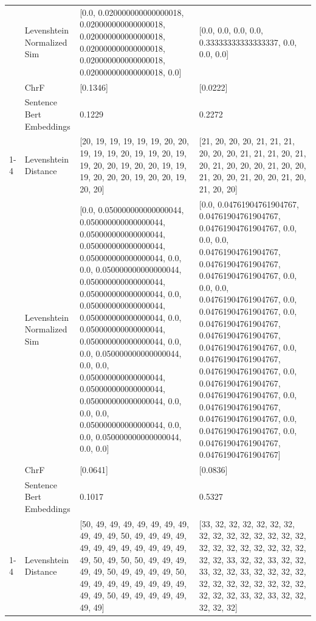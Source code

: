 \begin{tabular}{llll}
 & Levenshtein Normalized Sim & [0.0, 0.020000000000000018, 0.020000000000000018, 0.020000000000000018, 0.020000000000000018, 0.020000000000000018, 0.020000000000000018, 0.0] & [0.0, 0.0, 0.0, 0.0, 0.33333333333333337, 0.0, 0.0, 0.0] \\
 & ChrF & [0.1346] & [0.0222] \\
 & Sentence Bert Embeddings & 0.1229 & 0.2272 \\
\cline{1-4}
\multirow[t]{4}{*}{Okudizza guba mwoyo.} & Levenshtein Distance & [20, 19, 19, 19, 19, 19, 20, 20, 19, 19, 19, 20, 19, 19, 20, 19, 19, 20, 20, 19, 20, 20, 19, 19, 19, 20, 20, 20, 19, 20, 20, 19, 20, 20] & [21, 20, 20, 20, 21, 21, 21, 20, 20, 20, 21, 21, 21, 20, 21, 20, 21, 20, 20, 20, 21, 20, 20, 21, 20, 20, 21, 20, 20, 21, 20, 21, 20, 20] \\
 & Levenshtein Normalized Sim & [0.0, 0.050000000000000044, 0.050000000000000044, 0.050000000000000044, 0.050000000000000044, 0.050000000000000044, 0.0, 0.0, 0.050000000000000044, 0.050000000000000044, 0.050000000000000044, 0.0, 0.050000000000000044, 0.050000000000000044, 0.0, 0.050000000000000044, 0.050000000000000044, 0.0, 0.0, 0.050000000000000044, 0.0, 0.0, 0.050000000000000044, 0.050000000000000044, 0.050000000000000044, 0.0, 0.0, 0.0, 0.050000000000000044, 0.0, 0.0, 0.050000000000000044, 0.0, 0.0] & [0.0, 0.04761904761904767, 0.04761904761904767, 0.04761904761904767, 0.0, 0.0, 0.0, 0.04761904761904767, 0.04761904761904767, 0.04761904761904767, 0.0, 0.0, 0.0, 0.04761904761904767, 0.0, 0.04761904761904767, 0.0, 0.04761904761904767, 0.04761904761904767, 0.04761904761904767, 0.0, 0.04761904761904767, 0.04761904761904767, 0.0, 0.04761904761904767, 0.04761904761904767, 0.0, 0.04761904761904767, 0.04761904761904767, 0.0, 0.04761904761904767, 0.0, 0.04761904761904767, 0.04761904761904767] \\
 & ChrF & [0.0641] & [0.0836] \\
 & Sentence Bert Embeddings & 0.1017 & 0.5327 \\
\cline{1-4}
\multirow[t]{4}{*}{Omukulu watali, ebikere bibunduka.} & Levenshtein Distance & [50, 49, 49, 49, 49, 49, 49, 49, 49, 49, 49, 50, 49, 49, 49, 49, 49, 49, 49, 49, 49, 49, 49, 49, 49, 50, 49, 50, 50, 49, 49, 49, 49, 49, 50, 49, 49, 49, 49, 50, 49, 49, 49, 49, 49, 49, 49, 49, 49, 49, 50, 49, 49, 49, 49, 49, 49, 49] & [33, 32, 32, 32, 32, 32, 32, 32, 32, 32, 32, 32, 32, 32, 32, 32, 32, 32, 32, 32, 32, 32, 32, 32, 32, 33, 32, 32, 33, 32, 32, 33, 32, 32, 33, 32, 32, 32, 32, 32, 32, 32, 32, 32, 32, 32, 32, 32, 32, 32, 33, 32, 33, 32, 32, 32, 32, 32] \\

\end{tabular}
